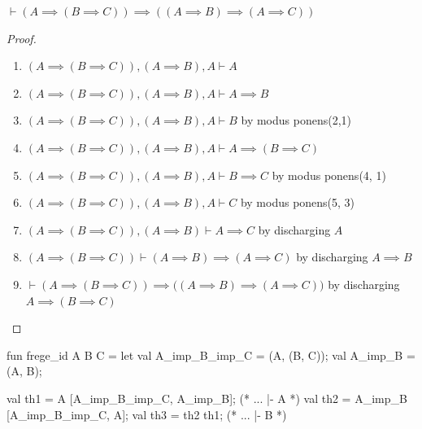 \begin{theorem}[Frege]
$\vdash(A\implies(B\implies C))\implies((A\implies B)\implies(A\implies C))$
\end{theorem}

\begin{proof}
\begin{enumerate}
\item $(A\implies(B\implies C)), (A\implies B), A\vdash A$
\item $(A\implies(B\implies C)), (A\implies B), A\vdash A\implies B$
\item $(A\implies(B\implies C)), (A\implies B), A\vdash B$ by modus ponens(2,1)
\item $(A\implies(B\implies C)), (A\implies B), A\vdash A\implies(B\implies C)$
\item $(A\implies(B\implies C)), (A\implies B), A\vdash B\implies C$
  by modus ponens(4, 1)
\item $(A\implies(B\implies C)), (A\implies B), A\vdash C$
  by modus ponens(5, 3)
\item $(A\implies(B\implies C)), (A\implies B)\vdash A\implies C$
  by discharging $A$
\item $(A\implies(B\implies C))\vdash (A\implies B)\implies(A\implies C)$
  by discharging $A\implies B$
\item $\vdash(A\implies(B\implies C))\implies\bigl((A\implies B)\implies(A\implies C)\bigr)$
  by discharging $A\implies(B\implies C)$\qedhere
\end{enumerate}
\end{proof}

\nwenddocs{}\endmoddef\nwstartdeflinemarkup{}\nwenddeflinemarkup
fun frege_id A B C =
  let
    val A_imp_B_imp_C = (A, (B, C));
    val A_imp_B = (A, B);

    val th1 =  A [A_imp_B_imp_C, A_imp_B]; (* ... |- A *)
    val th2 =  A_imp_B [A_imp_B_imp_C, A];
    val th3 =  th2 th1; (* ... |- B *)
    
